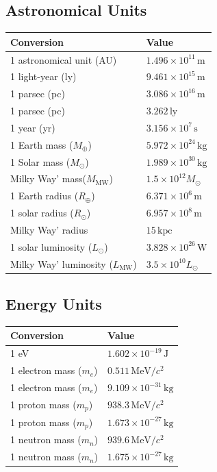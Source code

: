 \subsection*{Astronomical Units}
\begin{center}
\begin{tabular}{ll}
\toprule
\textbf{Conversion} & \textbf{Value} \\
\midrule
1 astronomical unit (AU) & $1.496 \times 10^{11} \,\mathrm{m}$ \\
1 light-year (ly)   & $9.461\times10^{15}\,\mathrm{m}$ \\
1 parsec (pc)       & $3.086\times10^{16}\,\mathrm{m}$ \\
1 parsec (pc)       & $3.262\,\mathrm{ly}$ \\
1 year (yr)         & $3.156\times10^{7}\,\mathrm{s}$ \\
\midrule
1 Earth mass ($M_\oplus$) & $5.972 \times 10^{24} \,\mathrm{kg}$ \\
1 Solar mass ($M_\odot$) & $1.989 \times 10^{30} \,\mathrm{kg}$ \\
Milky Way' mass($M_\text{MW}$) & $1.5 \times 10^{12} M_\odot$ \\
1 Earth radius ($R_\oplus$) & $6.371 \times 10^6 \,\mathrm{m}$ \\
1 solar radius ($R_\odot$) & $6.957 \times 10^8 \,\mathrm{m}$ \\
Milky Way' radius & $15\,\mathrm{kpc}$ \\
1 solar luminosity ($L_\odot$) & $3.828 \times 10^{26} \,\mathrm{W}$ \\
Milky Way' luminosity ($L_\text{MW}$) & $3.5 \times 10^{10} L_\odot$ \\
\bottomrule
\end{tabular}
\end{center}

\clearpage
\subsection*{Energy Units}
\begin{center}
\begin{tabular}{ll}
\toprule
\textbf{Conversion} & \textbf{Value} \\
\midrule
1 eV                & $1.602 \times 10^{-19} \,\mathrm{J}$ \\
1 electron mass ($m_e$) & $0.511 \,\mathrm{MeV}/c^2$ \\
1 electron mass ($m_e$) & $9.109 \times 10^{-31} \,\mathrm{kg}$ \\
1 proton mass ($m_p$) & $938.3 \,\mathrm{MeV}/c^2$ \\
1 proton mass ($m_p$) & $1.673 \times 10^{-27} \,\mathrm{kg}$ \\
1 neutron mass ($m_n$) & $939.6 \,\mathrm{MeV}/c^2$ \\
1 neutron mass ($m_n$) & $1.675 \times 10^{-27} \,\mathrm{kg}$ \\
\bottomrule
\end{tabular}
\end{center}


